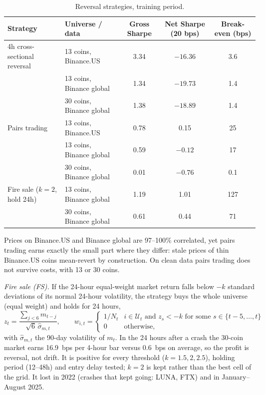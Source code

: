 \documentclass[aps,prl,onecolumn,superscriptaddress,nofootinbib]{revtex4-2}
\begin{document}
	\begin{table}[!htbp]
		\caption{Reversal strategies, training period.}
		\label{tab:reversal}
		\begin{ruledtabular}
			\begin{tabular}{llccc}
				Strategy & Universe / data & Gross Sharpe & Net Sharpe (20 bps) & Break-even (bps) \\
				\hline
				4h cross-sectional reversal & 13 coins, Binance.US     & 3.34 & $-16.36$ & 3.6 \\
				& 13 coins, Binance global & 1.34 & $-19.73$ & 1.4 \\
				& 30 coins, Binance global & 1.38 & $-18.89$ & 1.4 \\
				Pairs trading & 13 coins, Binance.US     & 0.78 & 0.15    & 25 \\
				& 13 coins, Binance global & 0.59 & $-0.12$ & 17 \\
				& 30 coins, Binance global & 0.01 & $-0.76$ & 0.1 \\
				Fire sale ($k = 2$, hold 24h) & 13 coins, Binance global & 1.19 & 1.01 & 127 \\
				& 30 coins, Binance global & 0.61 & 0.44 & 71 \\
			\end{tabular}
		\end{ruledtabular}
	\end{table}

	Prices on Binance.US and Binance global are 97--100\% correlated, yet pairs trading earns exactly the small part where they differ: stale prices of thin Binance.US coins mean-revert by construction. On clean data pairs trading does not survive costs, with 13 or 30 coins.

	\textit{Fire sale (FS).} If the 24-hour equal-weight market return falls below $-k$ standard deviations of its normal 24-hour volatility, the strategy buys the whole universe (equal weight) and holds for 24 hours,
	\begin{equation}
		z_t = \frac{\sum_{j<6} m_{t-j}}{\sqrt{6}\,\hat\sigma_{m,t}}, \qquad
		w_{i,t} =
		\begin{cases}
			1 / N_t & i \in \mathcal U_t \text{ and } z_s < -k \text{ for some } s \in \{t-5, \dots, t\} \\
			0 & \text{otherwise,}
		\end{cases}
		\label{eq:fs}
	\end{equation}
	with $\hat\sigma_{m,t}$ the 90-day volatility of $m_t$. In the 24 hours after a crash the 30-coin market earns 16.9~bps per 4-hour bar versus 0.6~bps on average, so the profit is reversal, not drift. It is positive for every threshold ($k = 1.5, 2, 2.5$), holding period (12--48h) and entry delay tested; $k = 2$ is kept rather than the best cell of the grid. It lost in 2022 (crashes that kept going: LUNA, FTX) and in January--August 2025.
\end{document}
